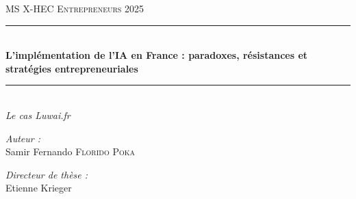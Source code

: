 \documentclass[12pt,a4paper]{report}
\numberwithin{figure}{chapter}
\numberwithin{table}{chapter}
\newcommand{\HRule}{\rule{\linewidth}{0.5mm}}
\begin{document}
\begin{titlepage}
\begin{center}

\begin{figure}[H]
    \centering
    \begin{minipage}{0.45\textwidth}
        \centering
    \end{minipage}\hfill
    \begin{minipage}{0.45\textwidth}
        \centering
    \end{minipage}
\end{figure}

\vspace{2cm}

\textsc{\LARGE MS X-HEC Entrepreneurs 2025}\\[1.5cm]

\HRule \\[0.4cm]
{\huge \bfseries L'implémentation de l'IA en France : paradoxes, résistances et stratégies entrepreneuriales}\\[0.4cm]
\HRule \\[1.5cm]

{\Large \textit{Le cas Luwai.fr}}\\[2cm]

\noindent
\begin{minipage}{0.48\textwidth}
    \begin{flushleft} \large
        \emph{Auteur :}\\
        Samir Fernando \textsc{Florido Poka}
    \end{flushleft}
\end{minipage}%
\hfill
\begin{minipage}{0.48\textwidth}
    \begin{flushright} \large
        \emph{Directeur de thèse :} \\
        Etienne Krieger
    \end{flushright}
\end{minipage}

\vspace{2cm}


\end{center}
\end{titlepage}
\end{document}
